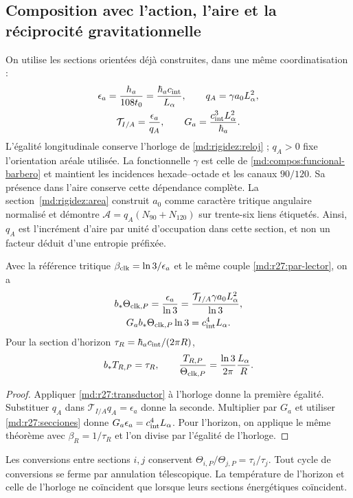 \subsection{Composition avec l'action, l'aire et la réciprocité gravitationnelle}
\label{md:r27:composicion}
On utilise les sections orientées déjà construites, dans une même coordinatisation :
\begin{equation}
 \begin{gathered}
 \epsilon_a=\frac{h_a}{108t_0}=\frac{\hbar_a c_{\rm int}}{L_\alpha},
 \qquad q_A=\gamma a_0L_\alpha^2,\\
 \mathcal T_{I/A}=\frac{\epsilon_a}{q_A},\qquad
 G_a=\frac{c_{\rm int}^3L_\alpha^2}{\hbar_a}.
 \end{gathered}
 \label{md:r27:secciones}
\end{equation}
L'égalité longitudinale conserve l'horloge de \eqref{md:rigidez:reloj} ; $q_A>0$ fixe l'orientation aréale utilisée. La fonctionnelle $\gamma$ est celle de \eqref{md:compos:funcional-barbero} et maintient les incidences hexade--octade et les canaux $90/120$. Sa présence dans l'aire conserve cette dépendance complète. La section~\ref{md:rigidez:area} construit $a_0$ comme caractère tritique angulaire normalisé et démontre $\mathcal A=q_A(N_{90}+N_{120})$ sur trente-six liens étiquetés. Ainsi, $q_A$ est l'incrément d'aire par unité d'occupation dans cette section, et non un facteur déduit d'une entropie préfixée.

\begin{corollary}
Avec la référence tritique $\beta_{\rm clk}=\ln3/\epsilon_a$ et le même couple \eqref{md:r27:par-lector}, on a
\begin{equation}
 \begin{gathered}
 b_*\Theta_{{\rm clk},P}
 =\frac{\epsilon_a}{\ln3}
 =\frac{\mathcal T_{I/A}\gamma a_0L_\alpha^2}{\ln3},\\
 G_a b_*\Theta_{{\rm clk},P}\ln3=c_{\rm int}^4L_\alpha.
 \end{gathered}
 \label{md:r27:area-gravedad}
\end{equation}
Pour la section d'horizon $\tau_R=\hbar_a c_{\rm int}/(2\pi R)$,
\begin{equation}
 b_*T_{R,P}=\tau_R,\qquad
 \frac{T_{R,P}}{\Theta_{{\rm clk},P}}
 =\frac{\ln3}{2\pi}\frac{L_\alpha}{R}.
 \label{md:r27:horizonte}
\end{equation}
\end{corollary}
\begin{proof}
Appliquer \eqref{md:r27:transductor} à l'horloge donne la première égalité. Substituer $q_A$ dans $\mathcal T_{I/A}q_A=\epsilon_a$ donne la seconde. Multiplier par $G_a$ et utiliser \eqref{md:r27:secciones} donne $G_a\epsilon_a=c_{\rm int}^4L_\alpha$. Pour l'horizon, on applique le même théorème avec $\beta_R=1/\tau_R$ et l'on divise par l'égalité de l'horloge.
\end{proof}
Les conversions entre sections $i,j$ conservent $\Theta_{i,P}/\Theta_{j,P}=\tau_i/\tau_j$. Tout cycle de conversions se ferme par annulation télescopique. La température de l'horizon et celle de l'horloge ne coïncident que lorsque leurs sections énergétiques coïncident.


